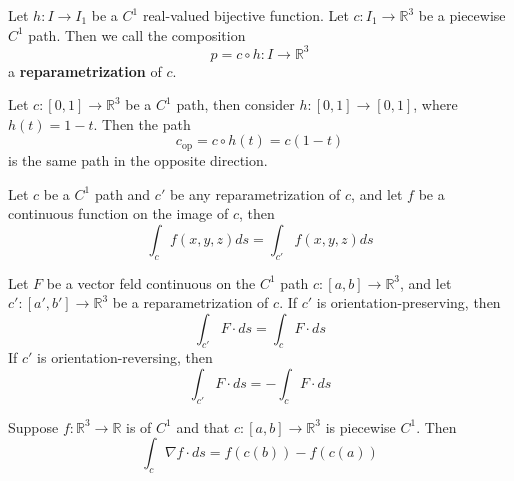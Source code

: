 \documentclass[openany]{book}
\newcommand{\R}{\mathbb{R}}
\begin{document}
\begin{defn}[reparametrization]
    Let $h: I\to I_1$ be a $C^1$ real-valued bijective function. Let $c: I_1\to\R^3$ be a piecewise $C^1$ path. Then we call the composition 
    \begin{equation*}
        p=c\circ h: I\to\R^3
    \end{equation*}
    a \textbf{ reparametrization} of $c$.
\end{defn}

\begin{example}
    Let $c:[0,1]\to\R^3$ be a $C^1$ path, then consider $h: [0,1]\to [0,1]$, where $h(t)=1-t$. Then the path 
    \begin{equation*}
        c_{\text{op}}=c\circ h(t)=c(1-t)
    \end{equation*}
    is the same path in the opposite direction.
\end{example}

\begin{prop}
    Let $c$ be a $C^1$ path and $c'$ be any reparametrization of $c$, and let $f$ be a continuous function on the image of $c$, then 
    \begin{equation*}
        \int_cf(x,y,z)ds=\int_{c'}f(x,y,z)ds
    \end{equation*}
\end{prop}

\begin{prop}
    Let $F$ be a vector feld continuous on the $C^1$ path $c:[a,b]\to\R^3$, and let $c':[a',b']\to\R^3$ be a reparametrization of $c$. If $c'$ is orientation-preserving, then 
    \begin{equation*}
        \int_{c'}F\cdot ds=\int_c F\cdot ds
    \end{equation*}
    If $c'$ is orientation-reversing, then 
    \begin{equation*}
        \int_{c'}F\cdot ds=-\int_cF\cdot ds
    \end{equation*}
\end{prop}

\begin{prop}
    Suppose $f:\R^3\to\R$ is of $C^1$ and that $c:[a,b]\to\R^3$ is piecewise $C^1$. Then 
    \begin{equation*}
        \int_c\nabla f\cdot ds=f(c(b))-f(c(a))
    \end{equation*}
\end{prop}
\end{document}
